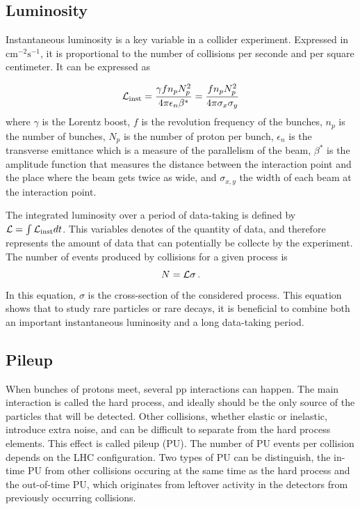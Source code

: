\subsection{Luminosity}

Instantaneous luminosity is a key variable in a collider experiment. Expressed in $\mathrm{cm^{-2} s^{-1}}$, it is proportional to the number of collisions per seconde and per square centimeter. It can be expressed as

\begin{equation}
    \mathcal{L}_{\rm{inst}} = \frac{\gamma f n_p N_p^2}{4\pi \epsilon_n \beta^{*}} = \frac{f n_p N_p^2}{4\pi \sigma_x \sigma_y}
\end{equation}
where $\gamma$ is the Lorentz boost, $f$ is the revolution frequency of the bunches, $n_p$ is the number of bunches, $N_p$ is the number of proton per bunch, $\epsilon_n$ is the transverse emittance which is a measure of the parallelism of the beam, $\beta^*$ is the amplitude function that measures the distance between the interaction point and the place where the beam gets twice as wide, and $\sigma_{x,y}$ the width of each beam at the interaction point.

The integrated luminosity over a period of data-taking is defined by $\mathcal{L} = \int \mathcal{L}_{\rm{inst}} dt$. This variables denotes of the quantity of data, and therefore represents the amount of data that can potentially be collecte by the experiment. The number of events produced by collisions for a given process is 
\begin{equation}
    N = \Lagr \sigma \mend
\end{equation}
In this equation, $\sigma$ is the cross-section of the considered process. This equation shows that to study rare particles or rare decays, it is beneficial to combine both an important instantaneous luminosity and a long data-taking period.

\subsection{Pileup}

When bunches of protons meet, several pp interactions can happen. The main interaction is called the hard process, and ideally should be the only source of the particles that will be detected. Other collisions, whether elastic or inelastic, introduce extra noise, and can be difficult to separate from the hard process elements. This effect is called pileup (PU). The number of PU events per collision depends on the LHC configuration. Two types of PU can be distinguish, the in-time PU from other collisions occuring at the same time as the hard process and the out-of-time PU, which originates from leftover activity in the detectors from previously occurring collisions.

